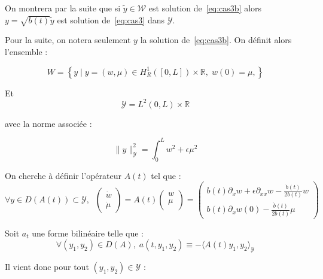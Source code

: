 \documentclass[a4paper]{article}
\begin{document}
On montrera par la suite que si $\tilde{y} \in \mathscr{W}$ 
est solution de~\eqref{eq:cas3b} 
alors $y = \sqrt{b(t)} \tilde{y}$ 
est solution de~\eqref{eq:cas3} dans $\mathscr{Y}$.


Pour la suite, on notera seulement $y$ la solution de~\eqref{eq:cas3b}.
On définit alors l'ensemble : 

	\[ W = \left\{ y \; | \; y = (w,\mu) \in H_R^1([0,L])\times \mathbb{R},
 	\; w(0)= \mu, \right\} \]
 
  Et 
   \[\mathscr{Y} = L^2(0,L)\times \mathbb{R}\] 
   
   avec la norme associée :

  \[\| y\|_{\mathscr{Y}}^2 = \int_0^L w^2 + \epsilon \mu^2 \]


 On cherche à définir l'opérateur $A(t)$ tel que :
 \[ \forall y \in D(A(t)) \subset \mathscr{Y}, \; \; 
 \left( \begin{array}{c}
 \dot{w}\\
 \dot{\mu}
 \end{array} \right)
 = A(t) \left( \begin{array}{c}
 w\\
 \mu\\
 \end{array} \right) 
 = \left(\begin{array}{c}
 b(t) \partial_x w + \epsilon \partial_{xx} w - \frac{\dot{b} (t) }{2b(t) } w \\
 b(t) \partial_x w(0) - \frac{\dot{b}(t)}{2b(t)} \mu
 \end{array}\right) \]
 
 Soit $a_t$ une forme bilinéaire telle que :
 \[ \forall (y_1,y_2) \in D(A), \; 
 a(t,y_1,y_2) \equiv - \langle A(t) y_1,y_2\rangle_{\mathscr{Y}} \]

 Il vient donc pour tout $(y_1,y_2) \in \mathscr{Y}$ :
\end{document}
